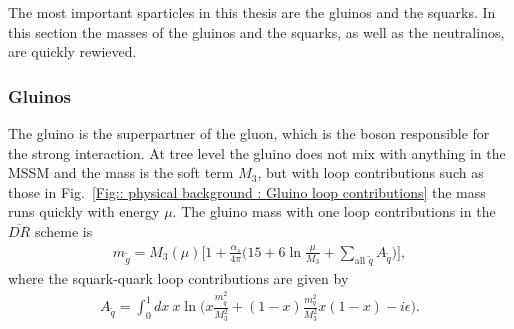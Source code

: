 \documentclass[twoside,english]{uiofysmaster}
\begin{document}
{The most important sparticles in this thesis are the gluinos and the squarks. In this section the masses of the gluinos and the squarks, as well as the neutralinos, are quickly rewieved.

\subsubsection{Gluinos}

The gluino is the superpartner of the gluon, which is the boson responsible for the strong interaction. At tree level the gluino does not mix with anything in the MSSM and the mass is the soft term $M_3$, but with loop contributions such as those in Fig.~\ref{Fig:: physical background : Gluino loop contributions} the mass runs quickly with energy $\mu$. The gluino mass with one loop contributions in the $\overline{DR}$ scheme is
\begin{align}
m_{\widetilde{g}} = M_3 (\mu) \Bigg[ 1 + \frac{\alpha_s}{4 \pi} \Bigg( 15 + 6 \ln \frac{\mu}{M_3} + \sum_{\text{all } \widetilde{q}} A_{\widetilde{q}} \Bigg) \Bigg],
\end{align}
where the squark-quark loop contributions are given by
\begin{align}
A_{\widetilde{q}} = \int_0^1 dx~ x \ln \big(x \frac{m_{\widetilde{q}}^2}{M_3^2} + (1-x) \frac{m_q^2}{M_3^2} x(1-x) - i \epsilon \big).
\end{align}



\begin{figure}
\end{figure}}
\end{document}
